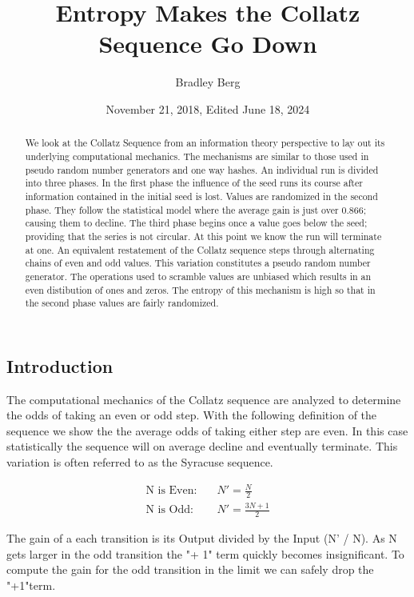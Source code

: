 \documentclass[letterpaper]{article}
\title{Entropy Makes the Collatz Sequence Go Down}
\author{Bradley Berg}
\date{November 21, 2018, Edited June 18, 2024}
\begin{document}
\maketitle

\begin{multicols}{2}

    \begin{abstract}
        We look at the Collatz Sequence from an information theory perspective to lay out its underlying computational mechanics. The mechanisms are similar to those used in pseudo random number generators and one way hashes.
        An individual run is divided into three phases.  In the first phase the influence of the seed runs its course after information contained in the initial seed is lost.  Values are randomized in the second phase.  They follow the statistical model where the average gain is just over 0.866; causing them to decline.  The third phase begins once a value goes below the seed; providing that the series is not circular.  At this point we know the run will terminate at one.
        An equivalent restatement of the Collatz sequence steps through alternating chains of even and odd values.  This variation constitutes a pseudo random number generator.  The operations used to scramble values are unbiased which results in an even distibution of ones and zeros.  The entropy of this mechanism is high so that in the second phase values are fairly randomized.
    \end{abstract}

    \section{Introduction}


    The computational mechanics of the Collatz sequence are analyzed to determine the odds of taking an even or odd step. With the following definition of the sequence we show the the average odds of taking either step are even. In this case statistically the sequence will on average decline and eventually terminate. This variation is often referred to as the Syracuse sequence.

    \begin{align*}
        \text{N is Even:} & \quad N' = \frac{N}{2}      \\
        \text{N is Odd:}  & \quad N' = \frac{3N + 1}{2}
    \end{align*}

    The gain of a each transition is its Output divided by the Input (N' / N). As N gets larger in the odd transition the "+ 1" term quickly becomes insignificant. To compute the gain for the odd transition in the limit we can safely drop the "+1"term.


\end{multicols}
\end{document}
